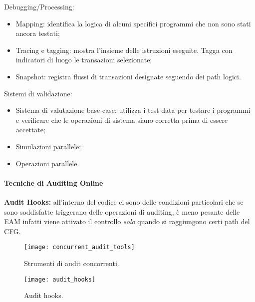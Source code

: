 Debugging/Processing:

\begin{itemize}
    \item Mapping: identifica la logica di alcuni specifici programmi che non sono stati ancora testati;
    \item Tracing e tagging: mostra l'insieme delle istruzioni eseguite. Tagga con indicatori di luogo le 
    transazioni selezionate;
    \item Snapshot: registra flussi di transazioni designate seguendo dei path logici.
\end{itemize}

Sistemi di validazione:

\begin{itemize}
    \item Sistema di valutazione base-case: utilizza i test data per testare i programmi e verificare che 
    le operazioni di sistema siano corretta prima di essere accettate;
    \item Simulazioni parallele;
    \item Operazioni parallele.
\end{itemize}

\paragraph{Tecniche di Auditing Online}

\textbf{Audit Hooks:} all'interno del codice ci sono delle condizioni particolari che se
sono soddisfatte triggerano delle operazioni di auditing, è meno pesante delle
EAM infatti viene attivato il controllo \emph{solo} quando si raggiungono certi path
del CFG.

\begin{figure}[h!]
        \begin{center}
                \texttt{[image: concurrent\_audit\_tools]}
        \end{center}
        \caption{Strumenti di audit concorrenti.}
        \label{fig:concurrent:audit:tools}
\end{figure}

\begin{figure}[h!]
        \begin{center}
                \texttt{[image: audit\_hooks]}
        \end{center}
        \caption{Audit hooks.}
        \label{fig:audit:hooks}
\end{figure}

